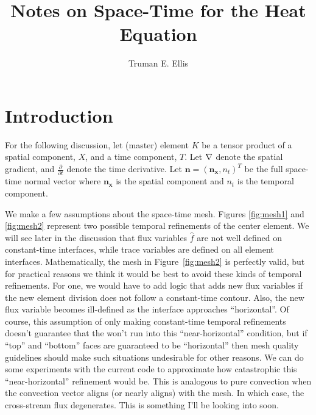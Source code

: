\documentclass{article}
\author{Truman E. Ellis}
\title{Notes on Space-Time for the Heat Equation}
\begin{document}
\maketitle

\section*{Introduction}
For the following discussion, let (master) element $K$ be a tensor product of a spatial
component, $X$, and a time component, $T$. Let $\nabla$ denote the spatial
gradient, and $\frac{\partial}{\partial t}$ denote the time derivative.
Let $\mathbf{n}=(\mathbf{n_x},n_t)^T$ be the full space-time normal vector
where $\mathbf{n_x}$ is the spatial component and $n_t$ is the temporal
component.

We make a few assumptions about the space-time mesh. Figures \ref{fig:mesh1}
and \ref{fig:mesh2} represent two possible temporal refinements of the center
element. We will see later in the discussion that flux variables $\hat f$ are
not well defined on constant-time interfaces, while trace variables are
defined on all element interfaces. Mathematically, the mesh in
Figure~\ref{fig:mesh2} is perfectly valid, but for practical reasons we think
it would be best to avoid these kinds of temporal refinements. For one, we
would have to add logic that adds new flux variables if the new element
division does not follow a constant-time contour. Also, the new flux variable
becomes ill-defined as the interface approaches ``horizontal''. Of course,
this assumption of only making constant-time temporal refinements doesn't
guarantee that the won't run into this ``near-horizontal'' condition, but if
``top'' and ``bottom'' faces are guaranteed to be ``horizontal'' then mesh
quality guidelines should make such situations undesirable for other reasons.
We can do some
experiments with the current code to approximate how catastrophic this
``near-horizontal'' refinement would be. This is analogous to pure convection
when the convection vector aligns (or nearly aligns) with the mesh. In which
case, the cross-stream flux degenerates. This is something I'll be looking
into soon.
\end{document}
